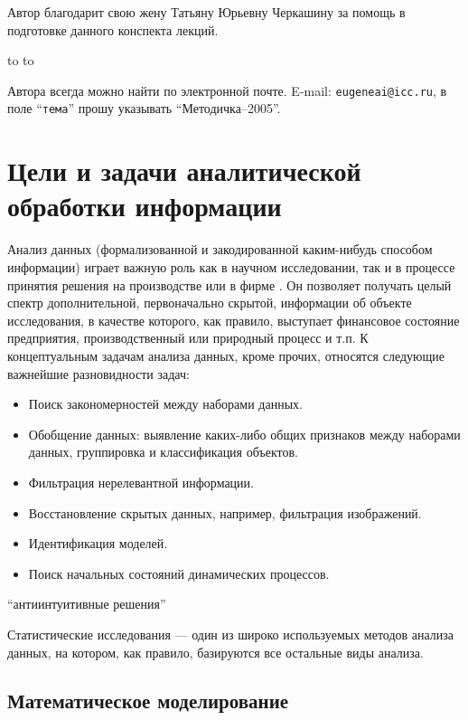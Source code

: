 \documentclass[12pt, openany, twoside]{book} %
\begin{document}
Автор благодарит свою жену Татьяну Юрьевну Черкашину за помощь в подготовке
данного конспекта лекций.

\medskip
\noindent\hbox to \linewidth{\hfill\sf И.о.зав.лаб. ИДСТУ СО РАН, и.о.доцента кафедры ВТ
ИрГТУ,}
\noindent\hbox to \linewidth{\hfill\sf к.т.н. Е.А.Черкашин}

\vfill
\makeatletter
{} Автора всегда можно найти по электронной почте. E-mail:
{\tt eugeneai@icc.ru}, в поле ``{\tt тема}'' прошу указывать ``Методичка--2005''.
\makeatother

\chapter{Цели и задачи аналитической обработки информации}

Анализ данных (формализованной и закодированной каким-нибудь способом информации) играет важную роль как в научном исследовании, так и в процессе принятия решения на производстве или в фирме . Он позволяет получать целый спектр дополнительной, первоначально скрытой,  информации об объекте исследования, в качестве которого, как правило, выступает финансовое состояние предприятия, производственный или природный процесс и т.п. К концептуальным задачам анализа данных, кроме прочих, относятся следующие важнейшие разновидности задач:
\begin{itemize}
\item Поиск закономерностей между наборами данных.
\item Обобщение данных: выявление каких-либо общих признаков между наборами данных, группировка и классификация объектов.
\item Фильтрация нерелевантной информации.
\item Восстановление скрытых данных, например, фильтрация изображений.
\item Идентификация моделей.
\item Поиск начальных состояний динамических процессов.
\end{itemize}

``антиинтуитивные решения''

Статистические исследования --– один из широко используемых методов анализа данных, на котором, как правило, базируются все остальные виды анализа. 
\section{Математическое моделирование}
\end{document}

